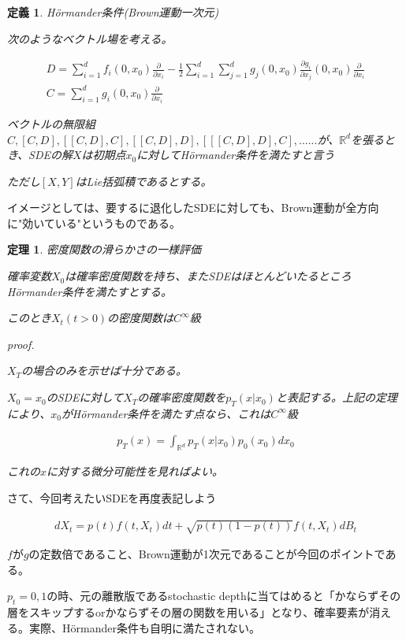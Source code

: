 \documentclass{jsarticle}
\newtheorem{theo}{定理}[section]
\newtheorem{defi}{定義}[section]
\begin{document}
\begin{defi} Hörmander条件(Brown運動一次元)

次のようなベクトル場を考える。

\begin{align}
D=\sum^d_{i=1}f_i(0,x_0)\frac{\partial}{\partial x_i}-\frac{1}{2}\sum^d_{i=1} \sum^d_{j=1}g_j(0,x_0) \frac{\partial g_i}{\partial x_j} (0,x_0)\frac{\partial}{\partial x_i}\\
C=\sum^d_{i=1}g_i(0,x_0)\frac{\partial}{\partial x_i}
\end{align}

ベクトルの無限組$C,[C,D],[[C,D],C],[[C,D],D],[[[C,D],D],C],......$が、$\mathbb{R}^d$を張るとき、SDEの解$X$は初期点$x_0$に対してHörmander条件を満たすと言う

ただし$[X,Y]$はLie括弧積であるとする。

\end{defi}

イメージとしては、要するに退化したSDEに対しても、Brown運動が全方向に"効いている"というものである。

\begin{theo} 密度関数の滑らかさの一様評価

確率変数$X_0$は確率密度関数を持ち、またSDEはほとんどいたるところHörmander条件を満たすとする。

このとき$X_t(t>0)$の密度関数は$C^\infty$級


proof.

$X_T$の場合のみを示せば十分である。

$X_0=x_0$のSDEに対して$X_T$の確率密度関数を$p_T(x|x_0)$と表記する。上記の定理により、$x_0$がHörmander条件を満たす点なら、これは$C^\infty$級

\begin{align}
p_T(x)=\int_{\mathbb{R}^d} p_T(x|x_0)p_0(x_0)dx_0
\end{align}

これの$x$に対する微分可能性を見ればよい。




\end{theo}


さて、今回考えたいSDEを再度表記しよう

\begin{align}
dX_t=p(t)f(t,X_t)dt+\sqrt{p(t)(1-p(t))}f(t,X_t)dB_t
\end{align}

$f$が$g$の定数倍であること、Brown運動が1次元であることが今回のポイントである。

$p_t=0,1$の時、元の離散版であるstochastic depthに当てはめると「かならずその層をスキップするorかならずその層の関数を用いる」となり、確率要素が消える。実際、Hörmander条件も自明に満たされない。
\end{document}
